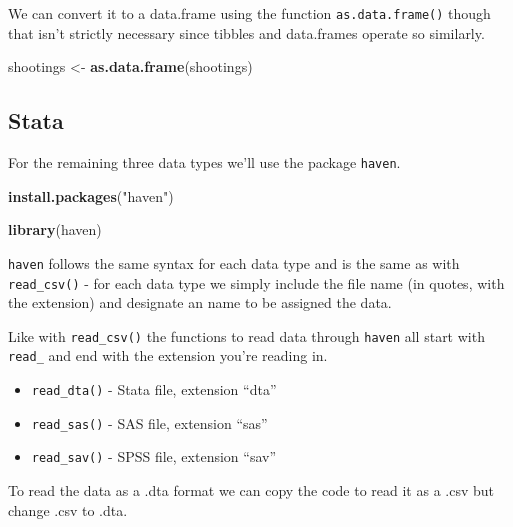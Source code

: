 \documentclass[
  12pt,
]{book}
\newenvironment{Shaded}{\begin{snugshade}}{\end{snugshade}}
\newcommand{\KeywordTok}[1]{\textcolor[rgb]{0.27,0.27,0.27}{\textbf{#1}}}
\newcommand{\NormalTok}[1]{#1}
\newcommand{\StringTok}[1]{\textcolor[rgb]{0.5,0.5,0.5}{#1}}
\providecommand{\tightlist}{%
  \setlength{\itemsep}{0pt}\setlength{\parskip}{0pt}}
\begin{document}
We can convert it to a data.frame using the function \texttt{as.data.frame()} though that isn't strictly necessary since tibbles and data.frames operate so similarly.

\begin{Shaded}
\begin{Highlighting}[]
\NormalTok{shootings <{-}}\StringTok{ }\KeywordTok{as.data.frame}\NormalTok{(shootings)}
\end{Highlighting}
\end{Shaded}

\hypertarget{stata}{%
\subsection{Stata}\label{stata}}

For the remaining three data types we'll use the package \texttt{haven}.

\begin{Shaded}
\begin{Highlighting}[]
\KeywordTok{install.packages}\NormalTok{(}\StringTok{"haven"}\NormalTok{)}
\end{Highlighting}
\end{Shaded}

\begin{Shaded}
\begin{Highlighting}[]
\KeywordTok{library}\NormalTok{(haven)}
\end{Highlighting}
\end{Shaded}

\texttt{haven} follows the same syntax for each data type and is the same as with \texttt{read\_csv()} - for each data type we simply include the file name (in quotes, with the extension) and designate an name to be assigned the data.

Like with \texttt{read\_csv()} the functions to read data through \texttt{haven} all start with \texttt{read\_} and end with the extension you're reading in.

\begin{itemize}
\tightlist
\item
  \texttt{read\_dta()} - Stata file, extension ``dta''
\item
  \texttt{read\_sas()} - SAS file, extension ``sas''
\item
  \texttt{read\_sav()} - SPSS file, extension ``sav''
\end{itemize}

To read the data as a .dta format we can copy the code to read it as a .csv but change .csv to .dta.
\end{document}
